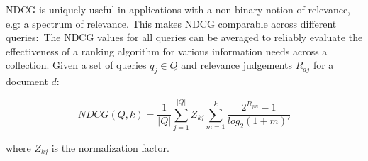 NDCG is uniquely useful in applications with a non-binary notion of relevance, e.g: a spectrum of relevance.
This makes NDCG comparable across different queries:\
The NDCG values for all queries can be averaged to reliably evaluate the effectiveness of a ranking algorithm for various information needs across a collection.
Given a set of queries $ q_j \in Q $ and relevance judgements $ R_{dj} $ for a document $ d $:\

\begin{equation}
NDCG(Q, k) = \frac{1}{|Q|} \sum ^{|Q|} _{j = 1} Z_{kj} \sum ^k _{m = 1} \frac{2^{R_{jm}} - 1}{log_2 (1 + m)'}
\end{equation}

where $ Z_{kj} $ is the normalization factor.